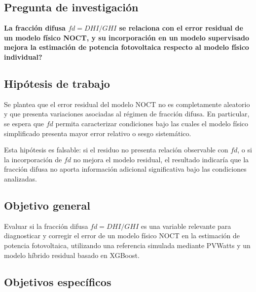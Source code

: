 \documentclass[12pt, letterpaper]{article}
\begin{document}
\subsection{Pregunta de investigaci\'on}

\textbf{\textquestiondown La fracci\'on difusa \(fd = DHI/GHI\) se relaciona con el error residual de un modelo f\'isico NOCT, y su incorporaci\'on en un modelo supervisado mejora la estimaci\'on de potencia fotovoltaica respecto al modelo f\'isico individual?}

\subsection{Hip\'otesis de trabajo}

Se plantea que el error residual del modelo NOCT no es completamente aleatorio y que presenta variaciones asociadas al r\'egimen de fracci\'on difusa. En particular, se espera que \(fd\) permita caracterizar condiciones bajo las cuales el modelo f\'isico simplificado presenta mayor error relativo o sesgo sistem\'atico.

Esta hip\'otesis es falsable: si el residuo no presenta relaci\'on observable con \(fd\), o si la incorporaci\'on de \(fd\) no mejora el modelo residual, el resultado indicar\'ia que la fracci\'on difusa no aporta informaci\'on adicional significativa bajo las condiciones analizadas.

\subsection{Objetivo general}

Evaluar si la fracci\'on difusa \(fd = DHI/GHI\) es una variable relevante para diagnosticar y corregir el error de un modelo f\'isico NOCT en la estimaci\'on de potencia fotovoltaica, utilizando una referencia simulada mediante PVWatts y un modelo h\'ibrido residual basado en XGBoost.

\subsection{Objetivos espec\'ificos}
\end{document}
